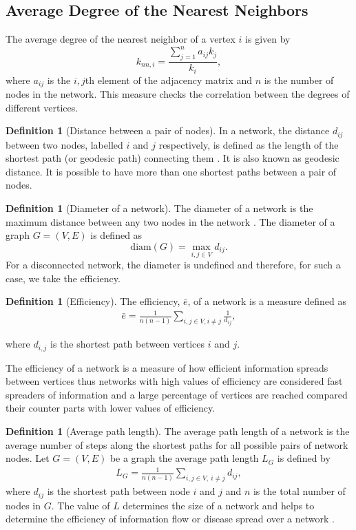 \documentclass[10pt,a4paper]{article}
\theoremstyle{plain}
\theoremstyle{definition}
\newtheorem{defn}[subsection]{Definition}
\begin{document}
\subsection{Average Degree of the Nearest Neighbors}
The average degree of the nearest neighbor of a vertex $i$ is given by
\begin{equation}
k_{nn,i} = \frac{\sum_{j=1}^{n} a_{ij} k_j}{k_i},
\end{equation}
where $a_{ij}$ is the $i,j$th element of the adjacency matrix and $n$ is the number of nodes in the network.
This measure checks the correlation between the degrees of different vertices.

\begin{defn}[Distance between a pair of nodes]
	In a network, the distance $d_{ij}$ between two nodes, labelled $i$ and $j$ respectively, is defined as the length of the shortest path (or geodesic path) connecting them \citep{wang2003complex}. It is also known as geodesic distance. It is possible to have more than one shortest paths between a pair of nodes.
\end{defn}
\begin{defn}[Diameter of a network]
	The diameter of a network is the maximum distance between any two
	nodes in the network \citep{wang2003complex}. The diameter of a graph $G= (V,E )$ is defined as \[ \text{diam}(G ) = \max_{i,j \in V} d_{ij}.\] For a disconnected network, the diameter is undefined and therefore, for such a case, we take the efficiency.
\end{defn}	

\begin{defn}[Efficiency]
	The efficiency, $\bar{e}$, of a network is a measure defined as
	\begin{eqnarray*}
		\bar{e} =\frac{1}{n(n-1)} \sum_{i,j \in V,i\neq j} \frac{1}{d_{ij}},
		\label{eqn:eff}
	\end{eqnarray*}
\end{defn}
where $d_{i,j}$ is the shortest path between vertices $i$ and $j$.

The efficiency of a network is a measure of how efficient information spreads between vertices thus networks with high values of efficiency are considered fast spreaders of information and a large percentage of vertices are reached compared their counter parts with lower values of efficiency.

\begin{defn}[Average path length]
	The average path length of a network is the average number of steps along the shortest paths for all possible pairs of network nodes. Let $G = (V , E )$ be a graph the average path length $L_G$ is defined by
	\begin{eqnarray}
	L_G = \frac{1}{n(n-1)} \sum_{i,j \in V,~i \neq j} d_{ij},
	\end{eqnarray}
	where $d_{ij}$ is the shortest path between node $i$ and $j$ and $n$ is the total number of nodes in $G$. The value of $L$ determines the size of a network and helps to determine the efficiency of information flow or disease spread over a network \citep{wang2003complex}.
\end{defn}
\end{document}
